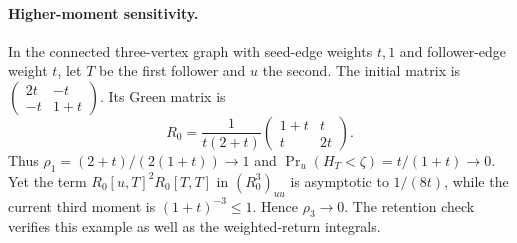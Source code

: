 \documentclass[11pt]{article}
\begin{document}
\paragraph{Higher-moment sensitivity.}
In the connected three-vertex graph with seed-edge weights $t,1$
and follower-edge weight $t$, let $T$ be the first follower and
$u$ the second. The initial matrix is
$\left(\begin{smallmatrix}2t&-t\\-t&1+t\end{smallmatrix}\right)$.
Its Green matrix is
\[
 R_0=\frac1{t(2+t)}
       \begin{pmatrix}1+t&t\\t&2t\end{pmatrix}.
\]
Thus $\rho_1=(2+t)/(2(1+t))\to1$ and
$\Pr_u(H_T<\zeta)=t/(1+t)\to0$.
Yet the term $R_0[u,T]^2R_0[T,T]$ in $(R_0^3)_{uu}$
is asymptotic to $1/(8t)$, while the current third moment is
$(1+t)^{-3}\leq1$. Hence $\rho_3\to0$. The retention check
verifies this example as well as the weighted-return integrals.
\end{document}
